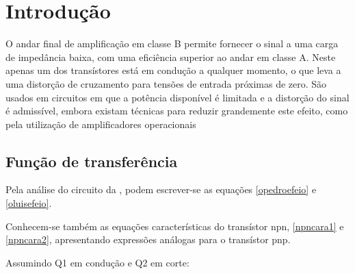 \documentclass[%
  reprint,
  nofootinbib,
  amsmath,amssymb,
  aps,
  10pt,
  a4paper
]{revtex4-1}
\begin{document}
\section{Introdução}
\label{s:intro}
O andar final de amplificação em classe B permite fornecer o sinal a uma carga de impedância baixa, com uma eficiência superior ao andar em classe A. Neste apenas um dos transístores está em condução a qualquer momento, o que leva a uma distorção de cruzamento para tensões de entrada próximas de zero. São usados em circuitos em que a potência disponível é limitada e a distorção do sinal é admissível, embora existam técnicas para reduzir grandemente este efeito, como pela utilização de amplificadores operacionais




\subsection{Função de transferência}
Pela análise do circuito da , podem escrever-se as equações \eqref{opedroefeio} e \eqref{oluisefeio}.

Conhecem-se também as equações características do transístor npn, \eqref{npncara1} e \eqref{npncara2}, apresentando expressões análogas para o transístor pnp.


Assumindo Q1 em condução e Q2 em corte:

\end{document}
